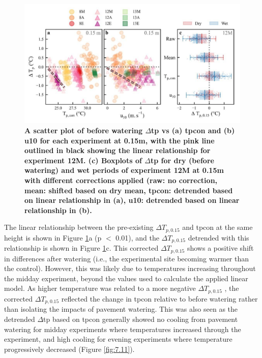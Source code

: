 \documentclass[final,3p,times,authoryear]{elsarticle}
\begin{document}
\begin{figure}
\centering
\includegraphics[trim={0 0 0 0},clip,scale=1.2]{pict011.jpg}
\caption{\bf A scatter plot of before watering $\Delta$\gls{tp} vs (a) \gls{tpcon} and (b) \gls{u10} for each experiment at 0.15m, with the pink line outlined in black showing the linear relationship for experiment 12M. (c) Boxplots of $\Delta$\gls{tp} for dry (before watering) and wet periods of experiment 12M at 0.15m with different corrections applied (raw: no correction, mean: shifted based on dry mean, \gls{tpcon}: detrended based on linear relationship in (a), \gls{u10}: detrended based on linear relationship in (b).}
 \label{fig:3.1}
\end{figure}

The linear relationship between the pre-existing $\Delta$$T_{p,0.15}$ and \gls{tpcon} at the same height is shown in Figure \ref{fig:3.1}a (p $<$ 0.01), and the $\Delta$$T_{p,0.15}$ detrended with this relationship is shown in Figure \ref{fig:3.1}c. This corrected $\Delta$$T_{p,0.15}$ shows a positive shift in differences after watering (i.e., the experimental site becoming warmer than the control). However, this was likely due to temperatures increasing throughout the midday experiment, beyond the values used to calculate the applied linear model. As higher temperature was related to a more negative $\Delta$$T_{p,0.15}$ , the corrected $\Delta$$T_{p,0.15}$ reflected the change in \gls{tpcon} relative to before watering rather than isolating the impacts of pavement watering. This was also seen as the detrended $\Delta$\gls{tp} based on \gls{tpcon} generally showed no cooling from pavement watering for midday experiments where temperatures increased through the experiment, and high cooling for evening experiments where temperature progressively decreased (Figure \ref{fig:7.11}).
\end{document}
